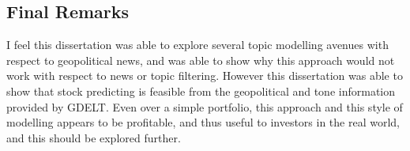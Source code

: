 \subsection{Final Remarks}

I feel this dissertation was able to explore several topic modelling avenues with respect to geopolitical news, and was able to show why this approach would not work with respect to news or topic filtering. However this dissertation was able to show that stock predicting is feasible from the geopolitical and tone information provided by GDELT. Even over a simple portfolio, this approach and this style of modelling appears to be profitable, and thus useful to investors in the real world, and this should be explored further. 

